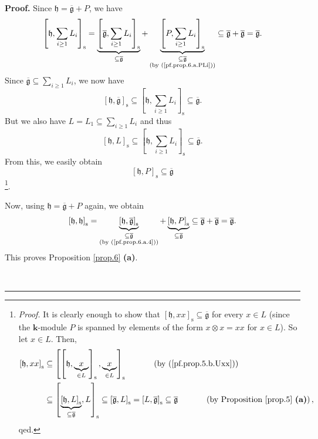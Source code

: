 \documentclass[numbers=enddot,12pt,final,onecolumn,notitlepage]{scrartcl}%
\theoremstyle{definition}
\newenvironment{proof}[1][Proof]{\noindent\textbf{#1.} }{\ \rule{0.5em}{0.5em}}
\let\sumnonlimits\sum
\renewcommand{\sum}{\sumnonlimits\limits}
\begin{document}
\begin{proof}
Since $\mathfrak{h}=\overline{\mathfrak{g}}+P$, we have%
\[
\left[  \mathfrak{h},\sum_{i\geq1}L_{i}\right]  _{\operatorname*{s}%
}=\underbrace{\left[  \overline{\mathfrak{g}},\sum_{i\geq1}L_{i}\right]
_{\operatorname*{s}}}_{\subseteq\overline{\mathfrak{g}}}+\underbrace{\left[
P,\sum_{i\geq1}L_{i}\right]  _{\operatorname*{s}}}_{\substack{\subseteq
\overline{\mathfrak{g}}\\\text{(by (\ref{pf.prop.6.a.PLi}))}}}\subseteq
\overline{\mathfrak{g}}+\overline{\mathfrak{g}}=\overline{\mathfrak{g}}.
\]
Since $\overline{\mathfrak{g}}\subseteq\sum_{i\geq1}L_{i}$, we now have
\begin{equation}
\left[  \mathfrak{h},\overline{\mathfrak{g}}\right]  _{\operatorname*{s}%
}\subseteq\left[  \mathfrak{h},\sum_{i\geq1}L_{i}\right]  _{\operatorname*{s}%
}\subseteq\overline{\mathfrak{g}}. \label{pf.prop.6.a.4}%
\end{equation}
But we also have $L=L_{1}\subseteq\sum_{i\geq1}L_{i}$ and thus%
\begin{equation}
\left[  \mathfrak{h},L\right]  _{\operatorname*{s}}\subseteq\left[
\mathfrak{h},\sum_{i\geq1}L_{i}\right]  _{\operatorname*{s}}\subseteq
\overline{\mathfrak{g}}. \label{pf.prop.6.a.6}%
\end{equation}
From this, we easily obtain%
\[
\left[  \mathfrak{h},P\right]  _{\operatorname*{s}}\subseteq\overline
{\mathfrak{g}}%
\]
\footnote{\textit{Proof.} It is clearly enough to show that $\left[
\mathfrak{h},xx\right]  _{\operatorname*{s}}\subseteq\overline{\mathfrak{g}}$
for every $x\in L$ (since the $\mathbf{k}$-module $P$ is spanned by elements
of the form $x\otimes x=xx$ for $x\in L$). So let $x\in L$. Then,%
\begin{align*}
\left[  \mathfrak{h},xx\right]  _{\operatorname*{s}}  &  \subseteq\left[
\left[  \mathfrak{h},\underbrace{x}_{\in L}\right]  _{\operatorname*{s}%
},\underbrace{x}_{\in L}\right]  _{\operatorname*{s}}%
\ \ \ \ \ \ \ \ \ \ \left(  \text{by (\ref{pf.prop.5.b.Uxx})}\right) \\
&  \subseteq\left[  \underbrace{\left[  \mathfrak{h},L\right]
_{\operatorname*{s}}}_{\subseteq\overline{\mathfrak{g}}},L\right]
_{\operatorname*{s}}\subseteq\left[  \overline{\mathfrak{g}},L\right]
_{\operatorname*{s}}=\left[  L,\overline{\mathfrak{g}}\right]
_{\operatorname*{s}}\subseteq\overline{\mathfrak{g}}%
\ \ \ \ \ \ \ \ \ \ \left(  \text{by Proposition \ref{prop.5} \textbf{(a)}%
}\right)  ,
\end{align*}
qed.}.

Now, using $\mathfrak{h}=\overline{\mathfrak{g}}+P$ again, we obtain%
\[
\left[  \mathfrak{h},\mathfrak{h}\right]  _{\operatorname*{s}}%
=\underbrace{\left[  \mathfrak{h},\overline{\mathfrak{g}}\right]
_{\operatorname*{s}}}_{\substack{\subseteq\overline{\mathfrak{g}}\\\text{(by
(\ref{pf.prop.6.a.4}))}}}+\underbrace{\left[  \mathfrak{h},P\right]
_{\operatorname*{s}}}_{\subseteq\overline{\mathfrak{g}}}\subseteq
\overline{\mathfrak{g}}+\overline{\mathfrak{g}}=\overline{\mathfrak{g}}.
\]
This proves Proposition \ref{prop.6} \textbf{(a)}. \medskip


\end{proof}
\end{document}
